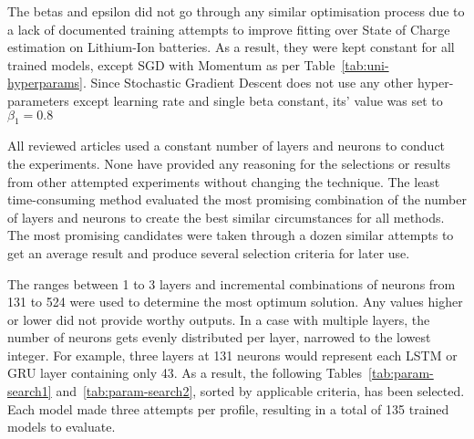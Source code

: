 %
The betas and epsilon did not go through any similar optimisation process due to a lack of documented training attempts to improve fitting over State of Charge estimation on Lithium-Ion batteries.
As a result, they were kept constant for all trained models, except SGD with Momentum as per \mbox{Table~\ref{tab:uni-hyperparams}}.
Since Stochastic Gradient Descent does not use any other hyper-parameters except learning rate and single beta constant, its' value was set to $\beta_1 = 0.8$
\begin{table}[htbp]
  \renewcommand{\arraystretch}{1.3}
  \caption{Optimisers Hyper-Parameters}
  \centering
  \label{tab:uni-hyperparams}
\end{table}

%
All reviewed articles used a constant number of layers and neurons to conduct the experiments.
None have provided any reasoning for the selections or results from other attempted experiments without changing the technique.
The least time-consuming method evaluated the most promising combination of the number of layers and neurons to create the best similar circumstances for all methods.
The most promising candidates were taken through a dozen similar attempts to get an average result and produce several selection criteria for later use.

%
The ranges between 1 to 3 layers and incremental combinations of neurons from 131 to 524 were used to determine the most optimum solution.
Any values higher or lower did not provide worthy outputs.
In a case with multiple layers, the number of neurons gets evenly distributed per layer, narrowed to the lowest integer.
For example, three layers at 131 neurons would represent each LSTM or GRU layer containing only 43.
As a result, the following Tables~\ref{tab:param-search1} and~\ref{tab:param-search2}, sorted by applicable criteria, has been selected.
Each model made three attempts per profile, resulting in a total of 135 trained models to evaluate.

